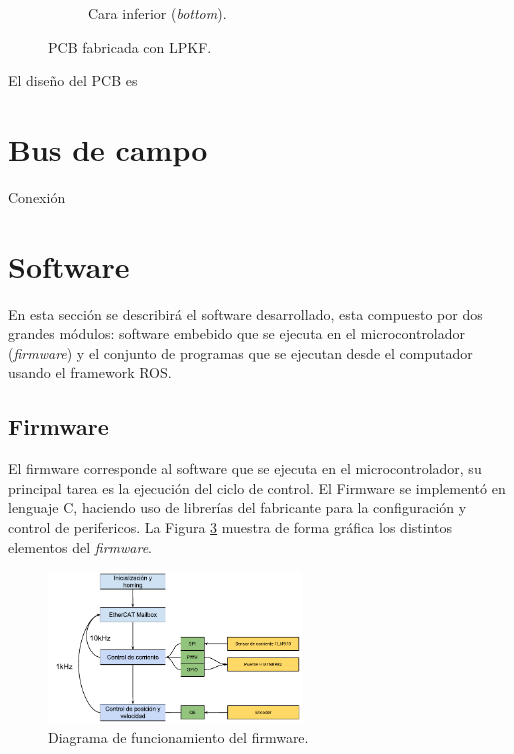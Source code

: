 \begin{figure}[H]
\begin{subfigure}[b]{0.45\textwidth}
    \caption{Cara inferior (\textit{bottom}).}
    \label{cap4_bottom_pcb}
    \end{subfigure}
  \caption{PCB fabricada con LPKF\textregistered.}
  \label{cap4_pcb}
\end{figure}

El diseño del PCB es 

\section{Bus de campo}

Conexión


\section{Software}

En esta sección se describirá el software desarrollado, esta compuesto por dos grandes módulos: software embebido que se ejecuta en el microcontrolador (\textit{firmware}) y el conjunto de programas que se ejecutan desde el computador usando el framework ROS.

\subsection{Firmware}

El firmware corresponde al software que se ejecuta en el microcontrolador, su principal tarea es la ejecución del ciclo de control. El Firmware se implementó en lenguaje C, haciendo uso de librerías del fabricante para la configuración y control de perifericos. La Figura \ref{cap4_scorbot_firmware} muestra de forma gráfica los distintos elementos del \textit{firmware}.

\begin{figure}[ht]
  \centering
  \includegraphics[width=0.6\textwidth]{img/cap4/scorbot_firmware.pdf}
  \caption{Diagrama de funcionamiento del firmware.}
  \label{cap4_scorbot_firmware}
\end{figure}


